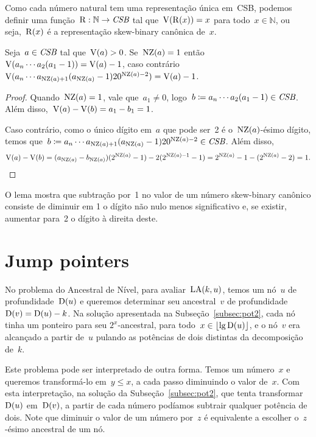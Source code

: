 \documentclass[main.tex]{subfiles}
\begin{document}
Como cada número natural tem uma representação única em~CSB, podemos definir uma função~${\operatorname{R}: \mathbb{N} \rightarrow \textit{CSB}}$ tal que~$\operatorname{V}(\operatorname{R}(x)) = x$ para todo~$x \in \mathbb{N}$, ou seja,~$\operatorname{R}(x)$ é a representação skew-binary canônica de~$x$.

\begin{lemma} \label{lem:csbsub}
	Seja~$a \in \textit{CSB}$ tal que~$\operatorname{V}(a) > 0$. Se~$\operatorname{NZ}(a) = 1$ então~$\operatorname{V}(a_n \cdots a_2 (a_1-1)) = \operatorname{V}(a) - 1$, caso contrário~${\operatorname{V}(a_n \cdots a_{\operatorname{NZ}(a)+1} (a_{\operatorname{NZ}(a)} - 1) 2 0^{\operatorname{NZ}(a) - 2}) = \operatorname{V}(a) - 1}$.
\end{lemma}
\begin{proof}
	Quando~$\operatorname{NZ}(a) = 1$, vale que~$a_1 \neq 0$, logo~${b \coloneqq a_n \cdots a_2 (a_1-1) \in \textit{CSB}}$. Além disso,~${\operatorname{V}(a) - \operatorname{V}(b) = a_1 - b_1 = 1}$.

	Caso contrário, como o único dígito em~$a$ que pode ser~2 é o~$\operatorname{NZ}(a)$-ésimo dígito, temos que~${b \coloneqq a_n \cdots a_{\operatorname{NZ}(a)+1} (a_{\operatorname{NZ}(a)} - 1) 2 0^{\operatorname{NZ}(a) - 2} \in \textit{CSB}}$. Além disso,
	$$ \operatorname{V}(a) - \operatorname{V}(b) = (a_{\operatorname{NZ}(a)} - b_{\operatorname{NZ}(a)}) (2^{\operatorname{NZ}(a)} - 1) - 2 (2^{\operatorname{NZ}(a) - 1} - 1) = 2^{\operatorname{NZ}(a)} - 1 - (2^{\operatorname{NZ}(a)} - 2) = 1. $$
\end{proof}

O lema mostra que subtração por~1 no valor de um número skew-binary canônico consiste de diminuir em 1 o dígito não nulo menos significativo e, se existir, aumentar para~2 o dígito à direita deste.

\section{Jump pointers}

No problema do Ancestral de Nível, para avaliar~$\operatorname{LA}(k, u)$, temos um nó~$u$ de profundidade~$\operatorname{D}(u)$ e queremos determinar seu ancestral~$v$ de profundidade~${\operatorname{D}(v) = \operatorname{D}(u) - k}$. Na solução apresentada na Subseção~\ref{subsec:pot2}, cada nó tinha um ponteiro para seu $2^x$-ancestral, para todo~${x \in \lfloor\lg\operatorname{D}(u)\rfloor}$, e o nó~$v$ era alcançado a partir de~$u$ pulando as potências de dois distintas da decomposição de~$k$.


Este problema pode ser interpretado de outra forma. Temos um número~$x$ e queremos transformá-lo em~$y \leq x$, a cada passo diminuindo o valor de~$x$. Com esta interpretação, na solução da Subseção~\ref{subsec:pot2}, que tenta transformar~$\operatorname{D}(u)$ em~$\operatorname{D}(v)$, a partir de cada número podíamos subtrair qualquer potência de dois. Note que diminuir o valor de um número por~$z$ é equivalente a escolher o~$z$-ésimo ancestral de um nó.
\end{document}
